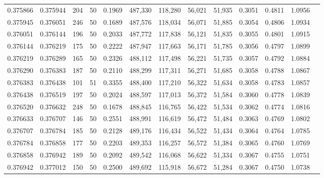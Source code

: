 \begin{tabular}{rrrrrrrrrrrrr}
0.375866 & 0.375944 &   204 &  50 &                                     0.1969 & 487,330 & 118,280 &  56,021 &  51,935 & 0.3051 & 0.4811 & 1.0956 \\
0.375945 & 0.376051 &   246 &  50 &                                     0.1689 & 487,576 & 118,034 &  56,071 &  51,885 & 0.3054 & 0.4806 & 1.0934 \\
0.376051 & 0.376144 &   196 &  50 &                                     0.2033 & 487,772 & 117,838 &  56,121 &  51,835 & 0.3055 & 0.4801 & 1.0915 \\
0.376144 & 0.376219 &   175 &  50 &                                     0.2222 & 487,947 & 117,663 &  56,171 &  51,785 & 0.3056 & 0.4797 & 1.0899 \\
0.376219 & 0.376289 &   165 &  50 &                                     0.2326 & 488,112 & 117,498 &  56,221 &  51,735 & 0.3057 & 0.4792 & 1.0884 \\
0.376290 & 0.376383 &   187 &  50 &                                     0.2110 & 488,299 & 117,311 &  56,271 &  51,685 & 0.3058 & 0.4788 & 1.0867 \\
0.376383 & 0.376438 &   101 &  51 &                                     0.3355 & 488,400 & 117,210 &  56,322 &  51,634 & 0.3058 & 0.4783 & 1.0857 \\
0.376438 & 0.376519 &   197 &  50 &                                     0.2024 & 488,597 & 117,013 &  56,372 &  51,584 & 0.3060 & 0.4778 & 1.0839 \\
0.376520 & 0.376632 &   248 &  50 &                                     0.1678 & 488,845 & 116,765 &  56,422 &  51,534 & 0.3062 & 0.4774 & 1.0816 \\
0.376633 & 0.376707 &   146 &  50 &                                     0.2551 & 488,991 & 116,619 &  56,472 &  51,484 & 0.3063 & 0.4769 & 1.0802 \\
0.376707 & 0.376784 &   185 &  50 &                                     0.2128 & 489,176 & 116,434 &  56,522 &  51,434 & 0.3064 & 0.4764 & 1.0785 \\
0.376784 & 0.376858 &   177 &  50 &                                     0.2203 & 489,353 & 116,257 &  56,572 &  51,384 & 0.3065 & 0.4760 & 1.0769 \\
0.376858 & 0.376942 &   189 &  50 &                                     0.2092 & 489,542 & 116,068 &  56,622 &  51,334 & 0.3067 & 0.4755 & 1.0751 \\
0.376942 & 0.377012 &   150 &  50 &                                     0.2500 & 489,692 & 115,918 &  56,672 &  51,284 & 0.3067 & 0.4750 & 1.0738 \\

\end{tabular}
